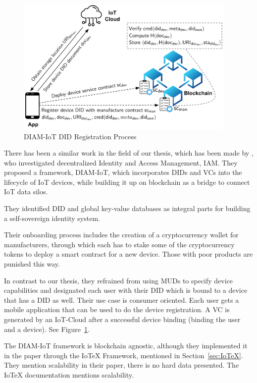 \begin{figure}
	\begin{center}
		\includegraphics[width=0.95\textwidth]{figures/diam-iot-did-registration.png}
	\end{center}
	\caption{DIAM-IoT DID Registration Process \cite{diam-iot-2020}}
	\label{fig:diam-iot-did-registration}
\end{figure}

There has been a similar work in the field of our thesis, which has been made by \cite{diam-iot-2020}, who investigated
decentralized Identity and Access Management, IAM. They proposed a framework, DIAM-IoT, which incorporates DIDs and VCs
into the lifecycle of IoT devices, while building it up on blockchain as a bridge to connect IoT data silos.

They identified DID and global key-value databases as integral parts for building a self-sovereign identity system.

Their onboarding process includes the creation of a cryptocurrency wallet for manufacturers, through which each has to
stake some of the cryptocurrency tokens to deploy a smart contract for a new device. Those with poor products are
punished this way.

In contrast to our thesis, they refrained from using MUDs to specify device capabilities and designated each user with
their DID which is bound to a device that has a DID as well. Their use case is consumer oriented. Each user gets a
mobile application that can be used to do the device registration. A VC is generated by an IoT-Cloud after a successful
device binding (binding the user and a device). See Figure~\ref{fig:diam-iot-did-registration}.

The DIAM-IoT framework is blockchain agnostic, although they implemented it in the paper through the IoTeX Framework,
mentioned in Section~\ref{sec:IoTeX}. They mention scalability in their paper, there is no hard data presented.
The IoTeX documentation mentions scalability.

